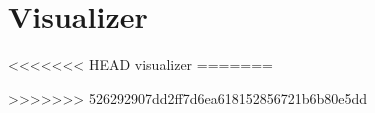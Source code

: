 
\chapter{Visualizer}


<<<<<<< HEAD
visualizer
=======

>>>>>>> 526292907dd2ff7d6ea618152856721b6b80e5dd
